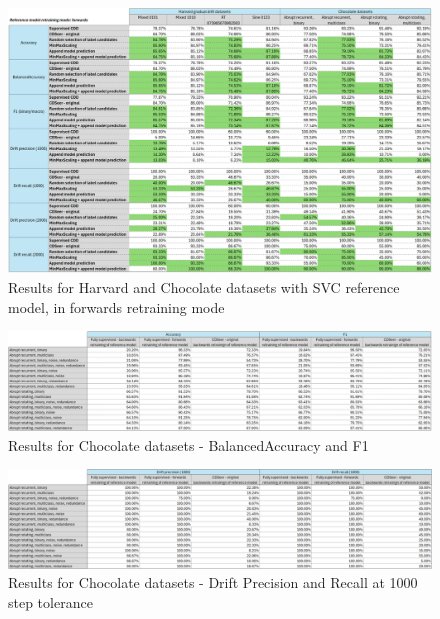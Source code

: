 \documentclass{svproc}
\begin{document}
 
 \begin{figure}
 	\centering
 	\includegraphics[scale=.95]{figures/Fig28_SVC_2.png}
 	\caption{Results for Harvard and Chocolate datasets with SVC reference model, in forwards retraining mode}
 	\label{fig:fig28}
 \end{figure}
 
 
 
 \begin{figure}
 	\centering
 	\includegraphics[scale=.95]{figures/Fig29_Chocolate_1.png}
 	\caption{Results for Chocolate datasets - BalancedAccuracy and F1}
 	\label{fig:fig29}
 \end{figure}
 
 \begin{figure}
 	\centering
 	\includegraphics[scale=.95]{figures/Fig30_Chocolate_2.png}
 	\caption{Results for Chocolate datasets - Drift Precision and Recall at 1000 step tolerance}
 	\label{fig:fig30}
 \end{figure}
 
\end{document}
